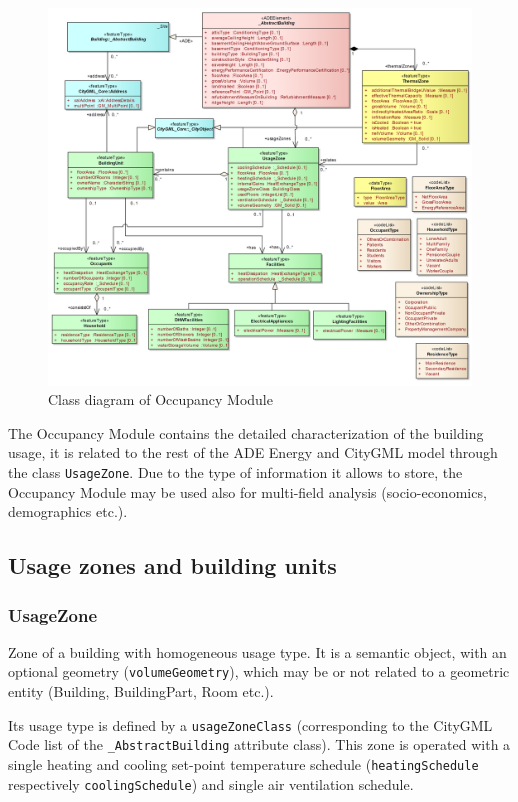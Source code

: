 \documentclass[a4paper,12pt]{article}
\begin{document}
\begin{figure}[htbp]
\centering
\includegraphics{fig/class_occupancy.png}
\caption{Class diagram of Occupancy Module}
\end{figure}

The Occupancy Module contains the detailed characterization of the
building usage, it is related to the rest of the ADE Energy and CityGML
model through the class \lstinline!UsageZone!. Due to the type of
information it allows to store, the Occupancy Module may be used also
for multi-field analysis (socio-economics, demographics etc.).

\subsection{Usage zones and building
units}\label{usage-zones-and-building-units}

\subsubsection{UsageZone}\label{usagezone}

Zone of a building with homogeneous usage type. It is a semantic object,
with an optional geometry (\lstinline!volumeGeometry!), which may be or
not related to a geometric entity (Building, BuildingPart, Room etc.).

Its usage type is defined by a \lstinline!usageZoneClass! (corresponding
to the CityGML Code list of the \lstinline!_AbstractBuilding! attribute
class). This zone is operated with a single heating and cooling
set-point temperature schedule (\lstinline!heatingSchedule! respectively
\lstinline!coolingSchedule!) and single air ventilation schedule.
\end{document}
